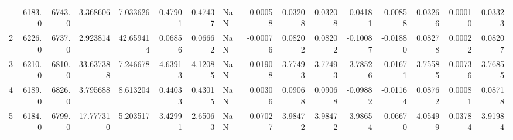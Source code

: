 \begin{longtable}{rrrrrrrlrrrrrrrr}
\bottomrule
\endlastfoot
           1 &          6183.0 &          6743.0 &            3.368606 &              7.033626 &                    0.47901 &                           0.47437 &                                        NaN &                                       -0.00058 &                                            0.03208 &                                            0.03208 &                                          -0.04181 &                                           -0.00858 &                 0.03266 &                0.00010 &                   0.03323 \\
           2 &          6226.0 &          6737.0 &            2.923814 &             42.659414 &                    0.06856 &                           0.06662 &                                        NaN &                                       -0.00076 &                                            0.08202 &                                            0.08202 &                                          -0.10087 &                                           -0.01880 &                 0.08278 &                0.00022 &                   0.08207 \\
           3 &          6210.0 &          6810.0 &           33.637388 &              7.246678 &                    4.63913 &                           4.12085 &                                        NaN &                                        0.01908 &                                            3.77493 &                                            3.77493 &                                          -3.78526 &                                           -0.01671 &                 3.75585 &                0.00736 &                   3.76855 \\
           4 &          6189.0 &          6826.0 &            3.795688 &              8.613204 &                    0.44033 &                           0.43015 &                                        NaN &                                        0.00306 &                                            0.09068 &                                            0.09068 &                                          -0.09882 &                                           -0.01164 &                 0.08762 &                0.00081 &                   0.08718 \\
           5 &          6184.0 &          6799.0 &           17.777310 &              5.203517 &                    3.42991 &                           2.65063 &                                        NaN &                                       -0.07027 &                                            3.98472 &                                            3.98472 &                                          -3.98654 &                                           -0.06670 &                 4.05499 &                0.03784 &                   3.91984 \\

\end{longtable}
